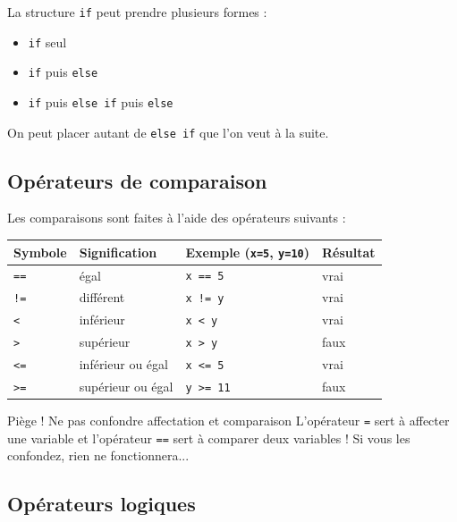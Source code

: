 La structure \texttt{if} peut prendre plusieurs formes :

\begin{itemize}
	\item \texttt{if} seul
	\item \texttt{if} puis \texttt{else}
	\item \texttt{if} puis \texttt{else if} puis \texttt{else}
\end{itemize}

On peut placer autant de \texttt{else if} que l'on veut à la suite.
\subsection{Opérateurs de comparaison}
\label{sec:operateur-comparaison}

Les comparaisons sont faites à l'aide des opérateurs suivants :

\begin{center}
	\begin{tabular}{|l|l|l|l|}
		\hline
		Symbole     & Signification     & Exemple (\texttt{x=5}, \texttt{y=10}) & Résultat \\
		\hline
		\texttt{==} & égal              & \texttt{x == 5}                       & vrai     \\
		\texttt{!=} & différent         & \texttt{x != y}                       & vrai     \\
		\texttt{<}  & inférieur         & \texttt{x < y}                        & vrai     \\
		\texttt{>}  & supérieur         & \texttt{x > y}                        & faux     \\
		\texttt{<=} & inférieur ou égal & \texttt{x <= 5}                       & vrai     \\
		\texttt{>=} & supérieur ou égal & \texttt{y >= 11}                      & faux     \\
		\hline
	\end{tabular}
\end{center}
\begin{UPSTIwarning}{Piège ! Ne pas confondre affectation et comparaison}
	L'opérateur \texttt{=} sert à affecter une variable et l'opérateur \texttt{==} sert à comparer deux variables ! Si vous les confondez, rien ne fonctionnera...
\end{UPSTIwarning}

\subsection{Opérateurs logiques}

